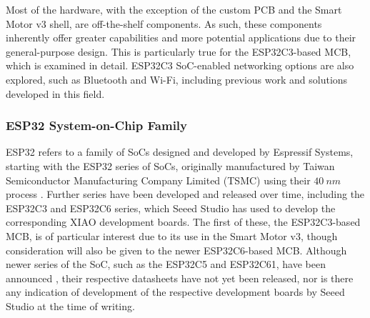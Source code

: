 Most of the hardware, with the exception of the custom PCB and the Smart Motor v3 shell, are off-the-shelf components. As such, these components inherently offer greater capabilities and more potential applications due to their general-purpose design. This is particularly true for the ESP32C3-based MCB, which is examined in detail. ESP32C3 SoC-enabled networking options are also explored, such as Bluetooth and Wi-Fi, including previous work and solutions developed in this field.

\subsubsection{\label{sec:rev_esp}ESP32 System-on-Chip Family}

ESP32 refers to a family of SoCs designed and developed by Espressif Systems, starting with the ESP32 series of SoCs, originally manufactured by Taiwan Semiconductor Manufacturing Company Limited (TSMC) using their $40\ nm$ process \citep{espressif_systems_esp32_2025}.
Further series have been developed and released over time, including the ESP32C3 and ESP32C6 series, which Seeed Studio has used to develop the corresponding XIAO development boards. The first of these, the ESP32C3-based MCB, is of particular interest due to its use in the Smart Motor v3, though consideration will also be given to the newer ESP32C6-based MCB. Although newer series of the SoC, such as the ESP32C5 and ESP32C61, have been announced \citep{espressif_systems_esp_nodate}, their respective datasheets have not yet been released, nor is there any indication of development of the respective development boards by Seeed Studio at the time of writing.\\


